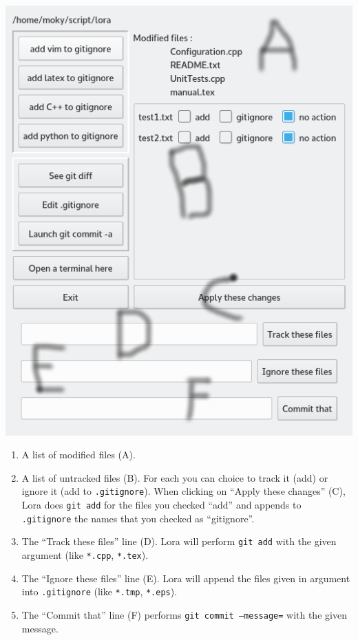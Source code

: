 \documentclass[a4paper,12pt]{article}
\newcommand{\info}[1]{\texttt{#1}}
\begin{document}
\begin{center}
    \includegraphics[width=\linewidth]{git_helper.png}
\end{center}

\begin{enumerate}
    \item
        A list of modified files (A).
    \item
        A list of untracked files (B). For each you can choice to track it (add) or ignore it (add to \info{.gitignore}). When clicking on ``Apply these changes'' (C), Lora does \info{git add} for the files you checked ``add'' and appends to \info{.gitignore} the names that you checked as ``gitignore''.
    \item
        The ``Track these files'' line (D). Lora will perform \info{git add} with the given argument (like \info{*.cpp}, \info{*.tex}).
    \item
        The ``Ignore these files'' line (E). Lora will append the files given in argument into \info{.gitignore} (like \info{*.tmp}, \info{*.eps}).
    \item
        The ``Commit that'' line (F) performs \info{git commit --message=} with the given message.
\end{enumerate}
\end{document}
